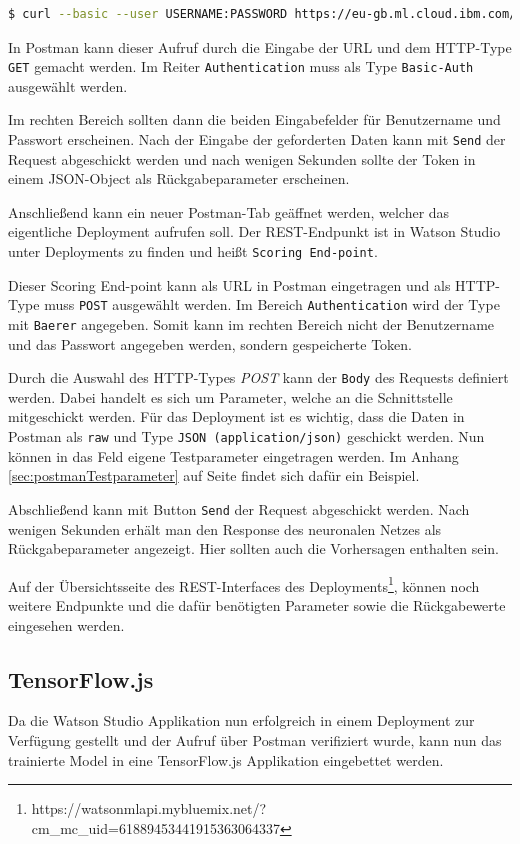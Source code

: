 \begin{lstlisting}[language=bash, caption=Abruf des Auth-Tokens, label=Abruf des Auth-Tokens]
$ curl --basic --user USERNAME:PASSWORD https://eu-gb.ml.cloud.ibm.com/v3/identity/token
\end{lstlisting}

In Postman kann dieser Aufruf durch die Eingabe der URL und dem HTTP-Type \texttt{GET} gemacht werden. Im Reiter
\texttt{Authentication} muss als Type \texttt{Basic-Auth} ausgewählt werden.

Im rechten Bereich sollten dann die beiden Eingabefelder für Benutzername und Passwort erscheinen. Nach der Eingabe der
geforderten Daten kann mit \texttt{Send} der Request abgeschickt werden und nach wenigen Sekunden sollte der Token in
einem JSON-Object als Rückgabeparameter erscheinen.

Anschließend kann ein neuer Postman-Tab geäffnet werden, welcher das eigentliche Deployment aufrufen soll. Der
REST-Endpunkt ist in Watson Studio unter Deployments zu finden und heißt \texttt{Scoring End-point}.

Dieser Scoring End-point kann als URL in Postman eingetragen und als HTTP-Type muss \texttt{POST} ausgewählt werden. Im
Bereich \texttt{Authentication} wird der Type mit \texttt{Baerer} angegeben. Somit kann im rechten Bereich nicht der
Benutzername und das Passwort angegeben werden, sondern gespeicherte Token.

Durch die Auswahl des HTTP-Types \textit{POST} kann der \texttt{Body} des Requests definiert werden. Dabei handelt es
sich um Parameter, welche an die Schnittstelle mitgeschickt werden. Für das Deployment ist es wichtig, dass die Daten
in Postman als \texttt{raw} und Type \texttt{JSON (application/json)} geschickt werden. Nun können in das Feld eigene
Testparameter eingetragen werden. Im Anhang \ref{sec:postmanTestparameter} auf Seite \pageref{sec:postmanTestparameter}
findet sich dafür ein Beispiel.

Abschließend kann mit Button \texttt{Send} der Request abgeschickt werden. Nach wenigen Sekunden erhält man den Response
des neuronalen Netzes als Rückgabeparameter angezeigt. Hier sollten auch die Vorhersagen enthalten sein.

Auf der Übersichtsseite des REST-Interfaces des
Deployments\footnote{https://watson\-ml\-api.mybluemix.net/?cm\_mc\_uid=61889453441915363064337}, können noch weitere
Endpunkte und die dafür benötigten Parameter sowie die Rückgabewerte eingesehen werden.

\subsection{TensorFlow.js}
Da die Watson Studio Applikation nun erfolgreich in einem Deployment zur Verfügung gestellt und der Aufruf über
Postman verifiziert wurde, kann nun das trainierte Model in eine TensorFlow.js Applikation eingebettet werden.

